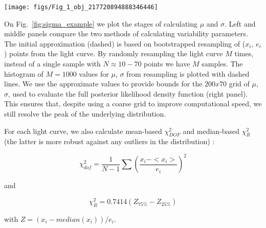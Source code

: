 \documentclass[fleqn,usenatbib]{mnras}  %
\begin{document}
\begin{figure*}
\texttt{[image: figs/Fig\_1\_obj\_217720894888346446]}
\caption{Two-step approach to finding $\mu$ and $\sigma$ via $\mu_{0}$ and $\sigma_{0}$ for an object 217720894888346446. In this calculation we use raw psf flux. On the left and middle panels,  solid lines trace marginalized posterior pdfs for $\mu$ and $\sigma$ , while dashed lines depict histogram distributions of 10,000 bootstrap resamples for $\mu_{0}$ and $\sigma_{0}$. The right panel shows the logarithm of the posterior probability density function for $\mu$ and $\sigma$.}
\label{fig:sigma_example}
\end{figure*}

On Fig.~\ref{fig:sigma_example} we plot the stages of calculating $\mu$ and $\sigma$. Left and middle panels compare the two methods of calculating variability parameters. The initial approximation (dashed) is based on bootstrapped resampling of ($x_i$, $e_i$) points from  the light curve. By randomly resampling the light curve $M$ times, instead of a single sample with $N \approx 10-70 $ points  we have $M$ samples. The histogram of  $M=1000$ values for $\mu$, $\sigma$ from resampling is plotted with dashed lines. 
We use the approximate values to provide bounds for the $200 x 70$ grid of $\mu$, $\sigma$, used to evaluate the full posterior likelihood density function (right panel). This ensures that, despite using a coarse grid to improve computational speed,  we still resolve the peak of the underlying distribution. 



For each light curve, we also calculate mean-based $\chi^{2}_{DOF}$ and median-based $\chi^{2}_{R}$ (the latter is more robust against any outliers in the distribution) : 

\begin{equation}
\label{eqn:chi2DOF}
\chi^{2}_{dof} = \frac{1}{N-1}\sum{\left( \frac{x_{i} - <x_{i}>} {e_{i}} \right) ^{2}}
\end{equation}

\noindent and
 
\begin{equation}
\label{eqn:chi2R}
\chi^{2}_{R} = 0.7414 (Z_{75\%} - Z_{25\%} ) 
\end{equation}

\noindent with $Z=(x_{i} - median(x_{i})) / e_{i} $. 
\bigskip
\end{document}
